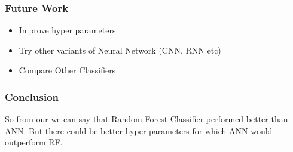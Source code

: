 \documentclass{beamer}
\begin{document}
\begin{frame}
\frametitle{Future Work}
\begin{itemize}
\item Improve hyper parameters
\item Try other variants of Neural Network (CNN, RNN etc)
\item Compare Other Classifiers
\end{itemize}

\end{frame}

\begin{frame}
\frametitle{Conclusion}

So from our we can say that Random Forest Classifier performed better than ANN. But there could be better hyper parameters for which ANN would outperform RF. 

\end{frame}
\end{document}

